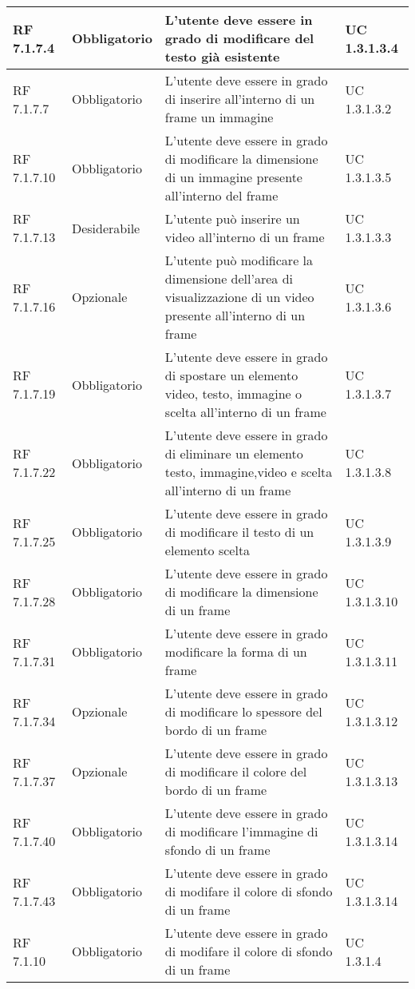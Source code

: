 {\begin{longtable} [c]{| p{2.5cm} | p{2.5cm} | p{6cm} |p{2.5cm}|}
			\hline
			RF 7.1.7.4 & Obbligatorio & L'utente deve essere in grado di modificare del testo già esistente & UC 1.3.1.3.4\\
			\hline
			RF 7.1.7.7 & Obbligatorio & L'utente deve essere in grado di inserire all'interno di un frame un immagine & UC 1.3.1.3.2\\
			\hline
			RF 7.1.7.10 & Obbligatorio & L'utente deve essere in grado di modificare la dimensione di un immagine presente all'interno del frame & UC 1.3.1.3.5\\
			\hline
			RF 7.1.7.13 & Desiderabile & L'utente può inserire un video all'interno di un frame & UC 1.3.1.3.3\\
			\hline
			RF 7.1.7.16 & Opzionale & L'utente può modificare la dimensione dell’area di visualizzazione di un video presente all'interno di un frame  & UC 1.3.1.3.6\\
			\hline
			RF 7.1.7.19 & Obbligatorio & L'utente deve essere in grado di spostare un elemento video, testo, immagine o scelta all'interno di un frame & UC 1.3.1.3.7\\
			\hline
			RF 7.1.7.22 & Obbligatorio & L'utente deve essere in grado di eliminare un elemento testo, immagine,video e scelta all'interno di un frame & UC 1.3.1.3.8\\
			\hline
			RF 7.1.7.25 & Obbligatorio & L'utente deve essere in grado di modificare il testo di un elemento scelta & UC 1.3.1.3.9\\
			\hline
			RF 7.1.7.28 & Obbligatorio & L'utente deve essere in grado di modificare la dimensione di un frame & UC 1.3.1.3.10\\
			\hline
			RF 7.1.7.31 & Obbligatorio & L'utente deve essere in grado modificare la forma di un frame & UC 1.3.1.3.11\\
			\hline
			RF 7.1.7.34 & Opzionale & L'utente deve essere in grado di modificare lo spessore del bordo di un frame & UC 1.3.1.3.12\\
			\hline
			RF 7.1.7.37 & Opzionale & L'utente deve essere in grado di modificare il colore del bordo di un frame & UC 1.3.1.3.13\\
			\hline
			RF 7.1.7.40 & Obbligatorio & L'utente deve essere in grado di modificare l'immagine di sfondo di un frame & UC 1.3.1.3.14\\
			\hline
			RF 7.1.7.43 & Obbligatorio & L'utente deve essere in grado di modifare il colore di sfondo di un frame & UC 1.3.1.3.14\\
			\hline
			RF 7.1.10 & Obbligatorio & L'utente deve essere in grado di modifare il colore di sfondo di un frame & UC 1.3.1.4\\

\end{longtable}}

